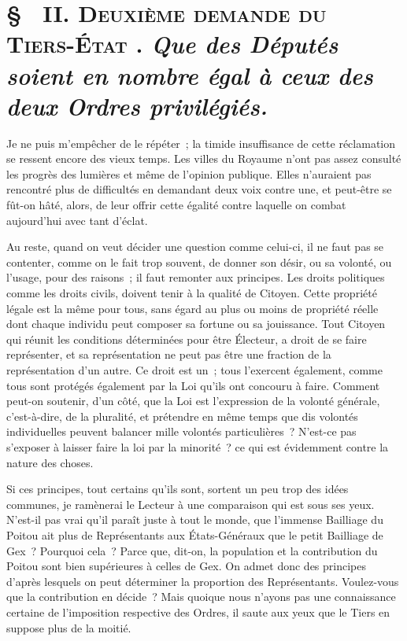 \documentclass[french,twoside]{book} %
\begin{document}
\section[{§  II. Deuxième demande du Tiers-État . Que des Députés soient en nombre égal à ceux des deux Ordres privilégiés.}]{ \textsc{§ } {\scshape II. Deuxième demande du Tiers-État} \textsc{. } {\itshape Que des Députés soient en nombre égal à ceux des deux Ordres privilégiés.} }
\noindent Je ne puis m’empêcher de le répéter ; la timide insuffisance de cette réclamation se ressent encore des vieux temps. Les villes du Royaume n’ont pas assez consulté les progrès des lumières et même de l’opinion publique. Elles n’auraient pas rencontré plus de difficultés en demandant deux voix contre une, et peut-être se fût-on hâté, alors, de leur offrir cette égalité contre laquelle on combat aujourd’hui avec tant d’éclat.\par
Au reste, quand on veut décider une question comme celui-ci, il ne faut pas se contenter, comme on le fait trop souvent, de donner son désir, ou sa volonté, ou l’usage, pour des raisons ; il faut remonter aux principes. Les droits politiques comme les droits civils, doivent tenir à la qualité de Citoyen. Cette propriété légale est la même pour tous, sans égard au plus ou moins de propriété réelle dont chaque individu peut composer sa fortune ou sa jouissance. Tout Citoyen qui réunit les conditions déterminées pour être Électeur, a droit de se faire représenter, et sa représentation ne peut pas être une fraction de la représentation d’un autre. Ce droit est un ; tous l’exercent également, comme tous sont protégés également par la Loi qu’ils ont concouru à faire. Comment peut-on soutenir, d’un côté, que la Loi est l’expression de la volonté générale, c’est-à-dire, de la pluralité, et prétendre en même temps que dis volontés individuelles peuvent balancer mille volontés particulières ? N’est-ce pas s’exposer à laisser faire la loi par la minorité ? ce qui est évidemment contre la nature des choses.\par
Si ces principes, tout certains qu’ils sont, sortent un peu trop des idées communes, je ramènerai le Lecteur à une comparaison qui est sous ses yeux. N’est-il pas vrai qu’il paraît juste à tout le monde, que l’immense Bailliage du Poitou ait plus de Représentants aux États-Généraux que le petit Bailliage de Gex ? Pourquoi cela ? Parce que, dit-on, la population et la contribution du Poitou sont bien supérieures à celles de Gex. On admet donc des principes d’après lesquels on peut déterminer la proportion des Représentants. Voulez-vous que la contribution en décide ? Mais quoique nous n’ayons pas une connaissance certaine de l’imposition respective des Ordres, il saute aux yeux que le Tiers en suppose plus de la moitié.\par
\end{document}
